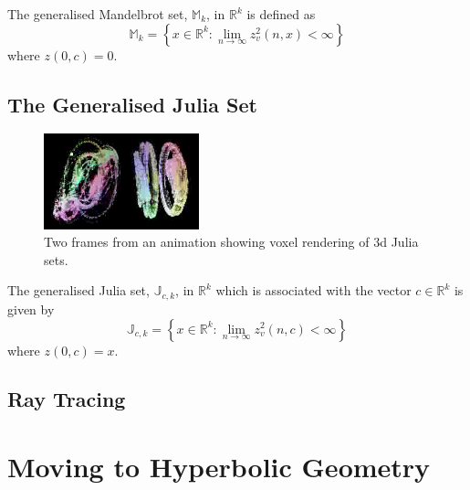 \begin{definition}
The generalised Mandelbrot set, $\mathbb{M}_k$, in $\mathbb{R}^k$ 
    is defined as
\[
\mathbb{M}_k = 
\left\{x \in \mathbb{R}^k 
: \lim_{n \rightarrow \infty} z_v^2(n,x) < \infty \right\} 
\]
where $z(0,c) = 0$.
\end{definition}

\subsection{The Generalised Julia Set}

\begin{figure}
\centering
\includegraphics[width=0.4\textwidth]{3djulia_pair.png}
\caption{\label{fig:3djulia}
  Two frames from an animation\cite{FRAC:JuliaAnimation} showing voxel
          rendering of 3d Julia sets.}
\end{figure}

\begin{definition}
The generalised Julia set, $\mathbb{J}_{c,k}$, in $\mathbb{R}^k$
which is associated with the vector $c \in \mathbb{R}^k$ is given by
\[
\mathbb{J}_{c,k} = 
\left\{x \in \mathbb{R}^k
: \lim_{n \rightarrow \infty} z_v^2(n,c) < \infty \right\} 
\]
where $z(0,c) = x$.
\end{definition}

\subsection{Ray Tracing}

\section{Moving to Hyperbolic Geometry}

